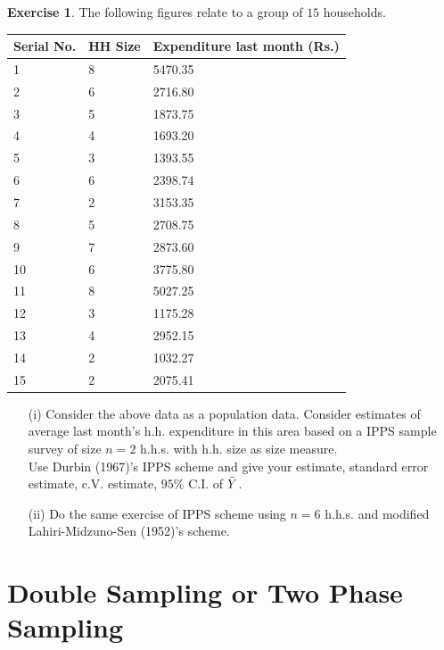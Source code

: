 \documentclass[12pt]{article}
\theoremstyle{definition}
\newtheorem{ex}{Exercise}
\newenvironment{exercise}{
\begin{tcolorbox}[colback=red!5!white,colframe=red!75!black, parbox = false]\begin{ex} }{\end{ex}\end{tcolorbox} }
\begin{document}
\begin{exercise}
The following figures relate to a group of $15$ households.
    \begin{center}
    \begin{tabular}{|l|l|l|}
    \hline
    Serial No. & HH Size & Expenditure last month (Rs.)  \\ \hline
        1 & 8 & 5470.35 \\ \hline
        2 & 6 & 2716.80 \\ \hline
        3& 5& 1873.75 \\ \hline
        4& 4& 1693.20\\ \hline
        5& 3& 1393.55\\ \hline
        6& 6& 2398.74 \\ \hline
        7& 2& 3153.35\\ \hline
        8& 5& 2708.75\\ \hline
        9& 7& 2873.60\\ \hline
        10& 6& 3775.80\\ \hline
        11& 8& 5027.25\\ \hline
        12& 3& 1175.28\\ \hline
        13& 4& 2952.15\\ \hline
        14& 2& 1032.27\\ \hline
        15& 2& 2075.41\\ \hline
    \end{tabular}
    \end{center}
    \begin{itemize}
        \item[(i)] Consider the above data as a population data. Consider estimates of average last month's h.h. expenditure in this area based on a IPPS sample survey of size $n=2$ h.h.s. with h.h. size as size measure. \\
        Use Durbin (1967)'s IPPS scheme and give your estimate, standard error estimate, c.V. estimate, $95\%$ C.I. of $\Bar{Y}$.
        \item[(ii)] Do the same exercise of IPPS scheme using $n=6$ h.h.s. and modified Lahiri-Midzuno-Sen (1952)'s scheme.
    \end{itemize}
\end{exercise}


\section{Double Sampling or Two Phase Sampling}
\end{document}
